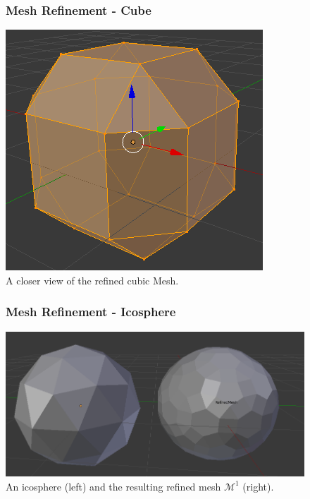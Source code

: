\documentclass[11pt]{beamer}
\begin{document}
	\begin{frame}
		\begin{figure}
			\frametitle{Mesh Refinement - Cube}
			\centering
			\includegraphics[width=.7\linewidth]{img/refine_cube_2}
			\caption{A closer view of the refined cubic Mesh.}		
		\end{figure}
	\end{frame}

	\begin{frame}
		\begin{figure}
			\frametitle{Mesh Refinement - Icosphere}
			\centering
			\includegraphics[width=.7\linewidth]{img/refine_icosphere}
			\caption{An icosphere (left) and the resulting refined mesh $\mathcal{M}^1$ (right).}		
		\end{figure}
	\end{frame}
\end{document}
